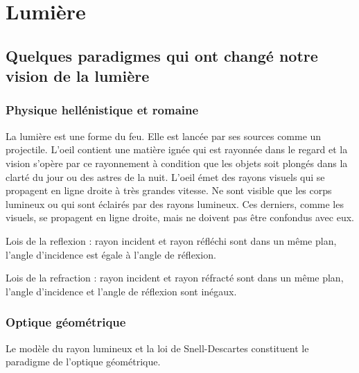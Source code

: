 \chapter{Lumière}

\section{Quelques paradigmes qui ont changé notre vision de la lumière}

\subsection{Physique hellénistique et romaine}

La lumière est une forme du feu. Elle est lancée par ses sources comme un projectile. L'oeil contient une matière ignée qui est rayonnée dans le regard et la vision s'opère par ce rayonnement à condition que les objets soit plongés dans la clarté du jour ou des astres de la nuit.
L'oeil émet des rayons visuels qui se propagent en ligne droite à très grandes vitesse. Ne sont visible que les corps lumineux ou qui sont éclairés par des rayons lumineux. Ces derniers, comme les visuels, se propagent en ligne droite, mais ne doivent pas être confondus avec eux.

Lois de la reflexion : rayon incident et rayon réfléchi sont dans un même plan, l'angle d'incidence est égale à l'angle de réflexion.

Lois de la refraction : rayon incident et rayon réfracté sont dans un même plan, l'angle d'incidence et l'angle de réflexion sont inégaux. 


\subsection{Optique géométrique}
Le modèle du rayon lumineux et la loi de Snell-Descartes constituent le paradigme de l'optique géométrique.

\begin{center}
\end{center}

\begin{center}
\end{center}

